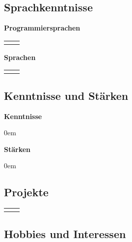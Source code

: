 \documentclass[
	a4paper,
	fontsize=12
]{scrartcl}
\begin{document}
\subsection{Sprachkenntnisse}
\begin{minipage}[t]{0.5\textwidth}
	\textbf{Programmiersprachen\medskip}\\
	\begin{tabularx}{\textwidth}{l!{\color{RoyalBlue}\vrule}X}
		\CVProgLangs
	\end{tabularx}
\end{minipage}
\begin{minipage}[t]{0.5\textwidth}
	\textbf{Sprachen\medskip}\\
	\begin{tabularx}{\textwidth}{l!{\color{RoyalBlue}\vrule}X}
		\CVNatLangs
	\end{tabularx}
\end{minipage}

\subsection{Kenntnisse und Stärken}
\begin{minipage}[t]{0.5\textwidth}
	\textbf{Kenntnisse}
	\begin{itemize}\itemsep0em
		\CVKnowledge
	\end{itemize}
\end{minipage}
\BlueVLine{ }
\begin{minipage}[t]{0.5\textwidth}
	\textbf{Stärken}
	\begin{itemize}\itemsep0em
		\CVStrength
	\end{itemize}
\end{minipage}

\filbreak
\subsection{Projekte}
\begin{flushleft}
	\setlength{\extrarowheight}{.5em}
	\begin{tabularx}{\textwidth}{l!{\color{RoyalBlue}\vrule}X}
		\CVProjects
	\end{tabularx}
\end{flushleft}

\subsection{Hobbies und Interessen}
	\CVHobbiesInterests
\newpage
\end{document}

